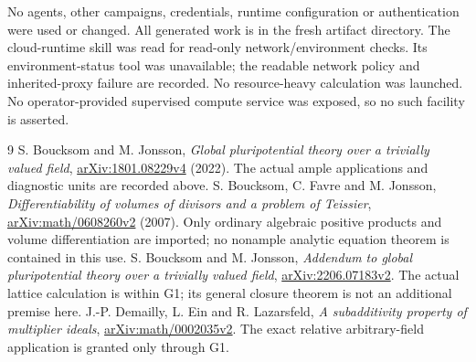 \documentclass[10pt]{article}
\begin{document}
No agents, other campaigns, credentials, runtime configuration or
authentication were used or changed. All generated work is in the fresh
artifact directory. The cloud-runtime skill was read for read-only
network/environment checks. Its environment-status tool was unavailable;
the readable network policy and inherited-proxy failure are recorded.
No resource-heavy calculation was launched. No operator-provided
supervised compute service was exposed, so no such facility is asserted.

\begin{thebibliography}{9}
 S. Boucksom and M. Jonsson,
\emph{Global pluripotential theory over a trivially valued field},
\href{https://arxiv.org/pdf/1801.08229v4}{arXiv:1801.08229v4} (2022).
The actual ample applications and diagnostic units are recorded above.
 S. Boucksom, C. Favre and M. Jonsson,
\emph{Differentiability of volumes of divisors and a problem of Teissier},
\href{https://arxiv.org/html/math/0608260v2}{arXiv:math/0608260v2} (2007).
Only ordinary algebraic positive products and volume differentiation are
imported; no nonample analytic equation theorem is contained in this use.
 S. Boucksom and M. Jonsson,
\emph{Addendum to global pluripotential theory over a trivially valued field},
\href{https://arxiv.org/pdf/2206.07183v2}{arXiv:2206.07183v2}.
The actual lattice calculation is within G1; its general closure theorem
is not an additional premise here.
 J.-P. Demailly, L. Ein and R. Lazarsfeld,
\emph{A subadditivity property of multiplier ideals},
\href{https://arxiv.org/html/math/0002035v2}{arXiv:math/0002035v2}.
The exact relative arbitrary-field application is granted only through G1.
\end{thebibliography}
\end{document}
